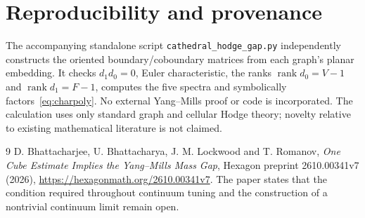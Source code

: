 \documentclass[11pt,a4paper]{article}
\begin{document}
\section{Reproducibility and provenance}
The accompanying standalone script \texttt{cathedral\_hodge\_gap.py} independently constructs the oriented boundary/coboundary matrices from each graph's planar embedding. It checks $d_1d_0=0$, Euler characteristic, the ranks $\operatorname{rank}d_0=V-1$ and $\operatorname{rank}d_1=F-1$, computes the five spectra and symbolically factors~\eqref{eq:charpoly}. No external Yang--Mills proof or code is incorporated. The calculation uses only standard graph and cellular Hodge theory; novelty relative to existing mathematical literature is not claimed.

\begin{thebibliography}{9}
 D. Bhattacharjee, U. Bhattacharya, J. M. Lockwood and T. Romanov, \emph{One Cube Estimate Implies the Yang--Mills Mass Gap}, Hexagon preprint 2610.00341v7 (2026), \url{https://hexagonmath.org/2610.00341v7}. The paper states that the condition required throughout continuum tuning and the construction of a nontrivial continuum limit remain open.
\end{thebibliography}
\end{document}
